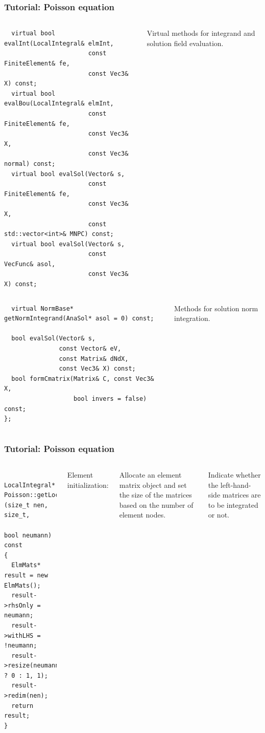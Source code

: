 \documentclass{beamer}
\begin{document}
\begin{frame}[fragile]
 \frametitle{Tutorial: Poisson equation}

 \begin{columns}[c]
  \tiny\begin{verbatim}
  virtual bool evalInt(LocalIntegral& elmInt,
                       const FiniteElement& fe,
                       const Vec3& X) const;
  virtual bool evalBou(LocalIntegral& elmInt,
                       const FiniteElement& fe,
                       const Vec3& X,
                       const Vec3& normal) const;
  virtual bool evalSol(Vector& s,
                       const FiniteElement& fe,
                       const Vec3& X,
                       const std::vector<int>& MNPC) const;
  virtual bool evalSol(Vector& s,
                       const VecFunc& asol,
                       const Vec3& X) const;
  \end{verbatim}
   \small
  Virtual methods for integrand and solution field evaluation.
 \end{columns}
 \pause
 \vskip-5mm
 \begin{columns}[c]
  \tiny\begin{verbatim}
  virtual NormBase* getNormIntegrand(AnaSol* asol = 0) const;

  bool evalSol(Vector& s,
               const Vector& eV,
               const Matrix& dNdX,
               const Vec3& X) const;
  bool formCmatrix(Matrix& C, const Vec3& X,
                   bool invers = false) const;
};
  \end{verbatim}
  \small
  Methods for solution norm integration.
 \end{columns}
\end{frame}

\begin{frame}[fragile] %
 \frametitle{Tutorial: Poisson equation}

 \begin{columns}[c]
  \tiny\begin{verbatim}

LocalIntegral* Poisson::getLocalIntegral (size_t nen, size_t,
                                          bool neumann) const
{
  ElmMats* result = new ElmMats();
  result->rhsOnly = neumann;
  result->withLHS = !neumann;
  result->resize(neumann ? 0 : 1, 1);
  result->redim(nen);
  return result;
}
  \end{verbatim}
  \small
  Element initialization:

  Allocate an element matrix object and set the size of the matrices
  based on the number of element nodes.

  Indicate whether the left-hand-side matrices are to be integrated or not.
 \end{columns}
\end{frame}
\end{document}
